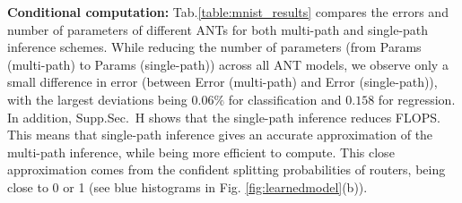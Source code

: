 \textbf{Conditional computation:} Tab.\ref{table:mnist_results} compares the errors and number of parameters of different ANTs for both multi-path and single-path inference schemes. While reducing the number of parameters (from Params (multi-path) to Params (single-path)) across all ANT models, we observe only a small difference in error (between Error (multi-path) and Error (single-path)), with the largest deviations being $0.06\%$ for classification and $0.158$ for regression. In addition, Supp.Sec.~H shows that the single-path inference reduces FLOPS. This means that single-path inference gives an accurate approximation of the multi-path inference, while being more efficient to compute. This close approximation comes from the confident splitting probabilities of routers, being close to 0 or 1 (see blue histograms in Fig. \ref{fig:learnedmodel}(b)).



